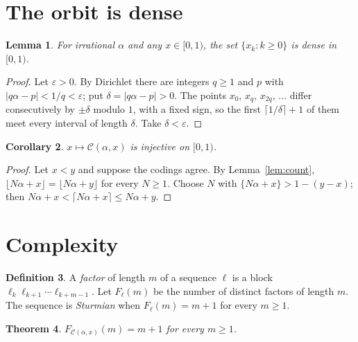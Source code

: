 \documentclass[11pt,a4paper]{article}
\newcommand{\C}{\mathcal{C}}
\theoremstyle{definition}
\newtheorem{definition}{Definition}
\theoremstyle{plain}
\newtheorem{theorem}[definition]{Theorem}
\newtheorem{lemma}[definition]{Lemma}
\newtheorem{corollary}[definition]{Corollary}
\begin{document}
\section{The orbit is dense}

\begin{lemma}\label{lem:dense}
For irrational $\alpha$ and any $x \in [0,1)$, the set $\{x_k : k \geq 0\}$ is
dense in $[0,1)$.
\end{lemma}

\begin{proof}
Let $\varepsilon > 0$. By Dirichlet there are integers $q \geq 1$ and $p$ with
$|q\alpha - p| < 1/q < \varepsilon$; put $\delta = |q\alpha - p| > 0$. The
points $x_0,\, x_q,\, x_{2q},\, \ldots$ differ consecutively by $\pm\delta$
modulo $1$, with a fixed sign, so the first $\lceil 1/\delta\rceil + 1$ of them
meet every interval of length $\delta$. Take $\delta < \varepsilon$.
\end{proof}

\begin{corollary}\label{cor:inj}
$x \mapsto \C(\alpha,x)$ is injective on $[0,1)$.
\end{corollary}

\begin{proof}
Let $x < y$ and suppose the codings agree. By Lemma~\ref{lem:count},
$\lfloor N\alpha + x\rfloor = \lfloor N\alpha+y\rfloor$ for every $N \geq 1$.
Choose $N$ with $\{N\alpha + x\} > 1 - (y-x)$; then
$N\alpha + x < \lceil N\alpha+x\rceil \leq N\alpha + y$.
\end{proof}

\section{Complexity}

\begin{definition}
A \emph{factor} of length $m$ of a sequence $\ell$ is a block
$\ell_k \ell_{k+1}\cdots \ell_{k+m-1}$. Let $F_\ell(m)$ be the number of
distinct factors of length $m$. The sequence is \emph{Sturmian} when
$F_\ell(m) = m+1$ for every $m \geq 1$.
\end{definition}

\begin{theorem}\label{thm:complexity}
$F_{\C(\alpha,x)}(m) = m+1$ for every $m \geq 1$.
\end{theorem}
\end{document}
